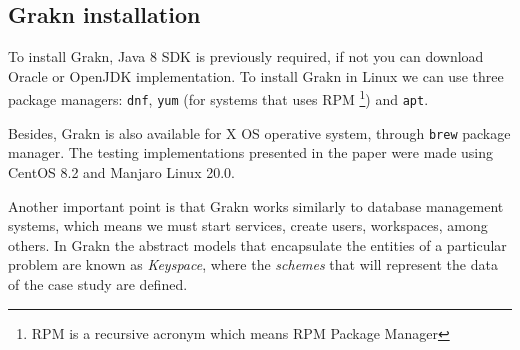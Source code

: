 \subsection{Grakn installation} %

To install Grakn, Java 8 SDK is previously required, if not you can download 
Oracle or OpenJDK implementation. To install Grakn in Linux we can use three 
package managers: \texttt{dnf}, \texttt{yum} (for systems that uses RPM
\footnote{RPM is a recursive acronym which means RPM Package Manager}) 
and \texttt{apt}.

Besides, Grakn is also available for X OS operative system,  through 
\texttt{brew} package manager. The testing implementations presented in the 
paper were made using CentOS 8.2 and Manjaro Linux 20.0.

Another important point is that Grakn works similarly to database management 
systems, which means we must start services, create users, workspaces, 
among others. In Grakn the abstract models that encapsulate 
the entities of a particular problem are known as \textit{Keyspace}, where the 
\textit{schemes} that will represent the data of the case study are defined.

